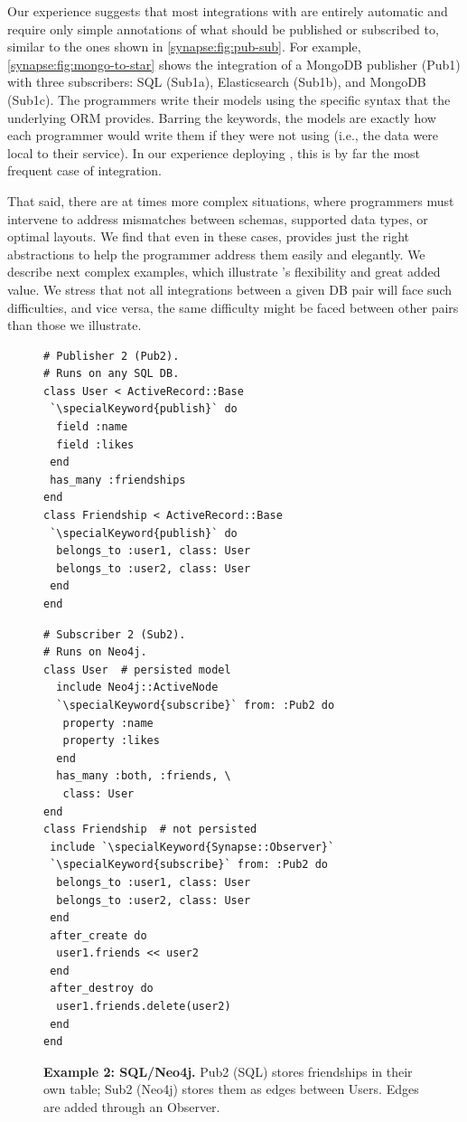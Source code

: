   Our experience suggests that most
integrations with \synapse are entirely automatic and require only simple
annotations of what should be published or subscribed to, similar to the ones shown
in \F\ref{synapse:fig:pub-sub}.  For example, \F\ref{synapse:fig:mongo-to-star} shows the
integration of a MongoDB publisher (Pub1) with three
subscribers: SQL (Sub1a), Elasticsearch (Sub1b), and
MongoDB (Sub1c). The programmers write their models using
the specific syntax that the underlying ORM
provides.  Barring the {} keywords, the
models are exactly how each programmer would write them if they were not using
\synapse (i.e., the data were local to their service).  In our experience
deploying \synapse, this is by far the most
frequent case of integration.

That said, there are at times more complex situations, where programmers must
intervene to address mismatches between schemas, supported data types, or
optimal layouts.  We find that even in these cases, \synapse provides just the
right abstractions to help the programmer address them easily and elegantly.
We describe next complex examples, which illustrate \synapse's flexibility
and great added value.  We stress that not all integrations between a given DB
pair will face such difficulties, and vice versa, the same difficulty might be
faced between other pairs than those we illustrate.


\begin{figure}
\centering
\begin{minipage}{.45\textwidth}
\begin{lstlisting}[framexleftmargin=5pt]
# Publisher 2 (Pub2).
# Runs on any SQL DB.
class User < ActiveRecord::Base
 `\specialKeyword{publish}` do
  field :name
  field :likes
 end
 has_many :friendships
end
class Friendship < ActiveRecord::Base
 `\specialKeyword{publish}` do
  belongs_to :user1, class: User
  belongs_to :user2, class: User
 end
end
\end{lstlisting}
\end{minipage}
\hspace{2em}
\begin{minipage}{.45\textwidth}
\begin{lstlisting}[framexleftmargin=5pt]
# Subscriber 2 (Sub2).
# Runs on Neo4j.
class User  # persisted model
  include Neo4j::ActiveNode
  `\specialKeyword{subscribe}` from: :Pub2 do
   property :name
   property :likes
  end
  has_many :both, :friends, \
   class: User
end
class Friendship  # not persisted
 include `\specialKeyword{Synapse::Observer}`
 `\specialKeyword{subscribe}` from: :Pub2 do
  belongs_to :user1, class: User
  belongs_to :user2, class: User
 end
 after_create do
  user1.friends << user2
 end
 after_destroy do
  user1.friends.delete(user2)
 end
end
\end{lstlisting}
\end{minipage}

\caption{{\bf Example 2: SQL/Neo4j.}
Pub2 (SQL) stores friendships in their own table; Sub2 (Neo4j) stores
them as edges between Users. Edges are added through an Observer.}
\label{synapse:fig:sql-to-neo4j}
\end{figure}

